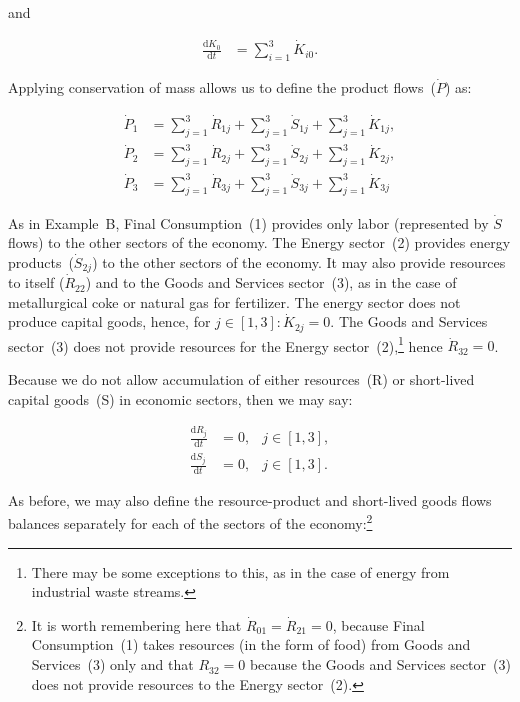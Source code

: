 \noindent{}and

\begin{align}
\label{eq:C_dK0a}
	\frac{\mathrm{d}K_{0}}{\mathrm{d}t}	&
	= \sum_{i = 1}^{3}\dot{K}_{i0}.
\end{align}

Applying conservation of mass
allows us to define the
product flows~($\dot{P}$) as:

\begin{align}
\label{eq:C_P1_def}
	\dot{P}_{1}										&
	= \sum_{j = 1}^{3}\dot{R}_{1j}
	+ \sum_{j = 1}^{3}\dot{S}_{1j}
	+ \sum_{j = 1}^{3}\dot{K}_{1j},	\\
\label{eq:C_P2_def}
	\dot{P}_{2}										&
	= \sum_{j = 1}^{3}\dot{R}_{2j}
	+ \sum_{j = 1}^{3}\dot{S}_{2j}
	+ \sum_{j = 1}^{3}\dot{K}_{2j},	\\
\label{eq:C_P3_def}							
	\dot{P}_{3}										&
	= \sum_{j = 1}^{3}\dot{R}_{3j}
	+ \sum_{j = 1}^{3}\dot{S}_{3j}
	+ \sum_{j = 1}^{3}\dot{K}_{3j}
\end{align}

As in Example~B, Final Consumption~(1) provides 
only labor (represented by $\dot{S}$ flows)
to the other sectors of the economy.
The Energy sector~(2) provides 
energy products~($\dot{S}_{2j}$) to the other
sectors of the economy. 
It may also provide resources to itself ($\dot{R}_{22}$)
and to the Goods and Services sector~(3), 
as in the case of metallurgical coke or 
natural gas for fertilizer.
The energy sector does not produce capital goods,
hence,
for $j \in [1,3]: \dot{K}_{2j} = 0$.
The Goods and Services sector~(3) does not provide
resources for the Energy sector~(2),\footnote{There
	may be some exceptions to this, as in the case of
	energy from industrial waste streams.}
hence $\dot{R}_{32} = 0$.

Because we do not allow accumulation of either
resources~(R) 
or short-lived capital goods~(S) 
in economic sectors,
then we may say:

\begin{align}\label{eq:C_dR_and_dS_zero}
	\frac{\mathrm{d}R_{j}}{\mathrm{d}t}			&
	= 0,																	&
	j \in [1,3],														\\
	\frac{\mathrm{d}S_{j}}{\mathrm{d}t} 		&
	= 0,																	&
	j \in [1,3].															
\end{align}

As before,
we may also define the resource-product
and short-lived goods flows balances separately
for each of the sectors of the economy:\footnote{It
	is worth remembering here that 
	$\dot{R}_{01} = \dot{R}_{21} = 0$,
	because Final Consumption~(1) takes resources
	(in the form of food) from Goods and Services~(3) only
	and that $R_{32} = 0$ because
	the Goods and Services sector~(3) does not provide
	resources to the Energy sector~(2).
	}

